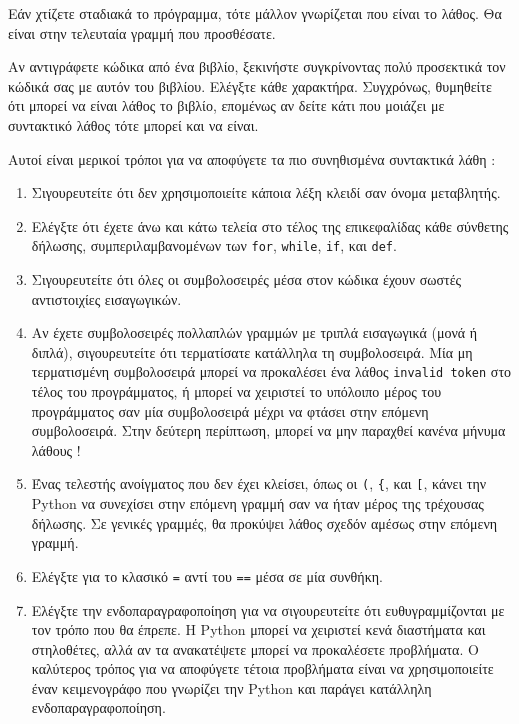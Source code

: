 \documentclass[10pt]{book}
\begin{document}
Εάν χτίζετε σταδιακά το πρόγραμμα, τότε μάλλον γνωρίζεται που είναι το λάθος. Θα είναι στην 
τελευταία γραμμή που προσθέσατε.

Αν αντιγράφετε κώδικα από ένα βιβλίο, ξεκινήστε συγκρίνοντας πολύ προσεκτικά τον κώδικά σας με 
αυτόν του βιβλίου.  Ελέγξτε κάθε χαρακτήρα.  Συγχρόνως, θυμηθείτε ότι μπορεί να είναι λάθος το 
βιβλίο, επομένως αν δείτε κάτι που μοιάζει με συντακτικό λάθος τότε μπορεί και να είναι.

Αυτοί είναι μερικοί τρόποι για να αποφύγετε τα πιο συνηθισμένα συντακτικά λάθη :

\begin{enumerate}

\item  Σιγουρευτείτε ότι δεν χρησιμοποιείτε κάποια λέξη κλειδί σαν όνομα μεταβλητής. 

\item  Ελέγξτε ότι έχετε άνω και κάτω τελεία στο τέλος της επικεφαλίδας κάθε σύνθετης 
δήλωσης, συμπεριλαμβανομένων των  {\tt for}, {\tt while}, {\tt if},  και  {\tt def}.

\item  Σιγουρευτείτε ότι όλες οι συμβολοσειρές μέσα στον κώδικα έχουν σωστές αντιστοιχίες  εισαγωγικών. 

\item  Αν έχετε συμβολοσειρές πολλαπλών γραμμών με τριπλά εισαγωγικά (μονά ή διπλά), σιγουρευτείτε ότι τερματίσατε κατάλληλα τη συμβολοσειρά.  Μία μη τερματισμένη συμβολοσειρά 
μπορεί να προκαλέσει ένα λάθος  {\tt invalid token}  στο τέλος του προγράμματος, ή μπορεί να χειριστεί το υπόλοιπο μέρος του προγράμματος σαν μία συμβολοσειρά μέχρι να φτάσει 
στην επόμενη συμβολοσειρά.  Στην δεύτερη περίπτωση, μπορεί να μην παραχθεί κανένα μήνυμα λάθους !

\item  Ένας τελεστής ανοίγματος που δεν έχει κλείσει, όπως οι  \verb+(+, \verb+{+,  
  και  \verb+[+,  κάνει την  Python  να συνεχίσει στην επόμενη γραμμή σαν να ήταν       
  μέρος της τρέχουσας δήλωσης.  Σε γενικές γραμμές, θα προκύψει λάθος σχεδόν αμέσως στην 
  επόμενη γραμμή. 

\item  Ελέγξτε για το κλασικό  {\tt =}  αντί του  {\tt ==}  μέσα σε μία συνθήκη. 

\item  Ελέγξτε την ενδοπαραγραφοποίηση για να σιγουρευτείτε ότι ευθυγραμμίζονται με τον τρόπο που θα έπρεπε.  Η  Python  μπορεί να χειριστεί κενά διαστήματα και στηλοθέτες, 
αλλά αν τα ανακατέψετε μπορεί να προκαλέσετε προβλήματα.  Ο καλύτερος τρόπος για να αποφύγετε 
τέτοια προβλήματα είναι να χρησιμοποιείτε έναν κειμενογράφο που γνωρίζει την  Python  
και παράγει κατάλληλη ενδοπαραγραφοποίηση. 

\end{enumerate}
\end{document}
